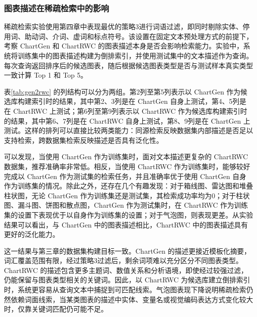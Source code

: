 \subsubsection{图表描述在稀疏检索中的影响}

稀疏检索实验使用第四章中表现最优的策略3进行词语过滤，即同时剔除实体、停用词、助动词、介词、虚词和标点符号。该设置在固定文本预处理方式的前提下，考察 ChartGen 和 ChartRWC 的图表描述本身是否会影响检索能力。实验中，系统将训练集中的图表描述构建为倒排索引，并使用测试集中的文本描述作为查询。每次查询返回排序后的候选图表，随后根据候选图表类型是否与测试样本真实类型一致计算 Top 1 和 Top 5。

表\ref{tab:gen2rwc} 的列结构可以分为两组。第2列至第5列表示以 ChartGen 作为候选库构建索引时的结果，其中第2、3列是在 ChartGen 自身上测试，第4、5列是在 ChartRWC 上测试；第6列至第9列表示以 ChartRWC 作为候选库构建索引时的结果，其中第6、7列是在 ChartRWC 自身上测试，第8、9列是在 ChartGen 上测试。这样的排列可以直接比较两类能力：同源检索反映数据集内部描述是否足以支持检索，跨数据集检索反映描述是否具有泛化性。

可以发现，当使用 ChartGen 作为训练集时，面对文本描述更复杂的 ChartRWC 数据集，推荐准确率非常低。相反，当使用 ChartRWC 作为训练集时，能够较好完成以 ChartGen 作为测试集的检索任务，并且准确率优于使用 ChartGen 自身作为训练集的情况。除此之外，还存在几个有趣发现：对于箱线图、雷达图和堆叠柱状图，无论 ChartGen 作为训练集还是测试集，其检索成功率均为0；对于柱状图、漏斗图、饼图和散点图，ChartGen 作为测试集时，在 ChartRWC 作为训练集的设置下表现优于以自身作为训练集的设置；对于气泡图，则表现更差。从实验结果可以看出，与 ChartGen 中的图表描述相比，ChartRWC 中的图表描述具有更好的泛化能力。

这一结果与第三章的数据集构建目标一致。ChartGen 的描述更接近模板化摘要，词汇覆盖范围有限，经过策略3过滤后，剩余词项难以充分区分不同图表类型。ChartRWC 的描述包含更多主题词、数值关系和分析语境，即使经过较强过滤，仍能保留与图表类型相关的关键词。因此，以 ChartRWC 为候选库建立倒排索引时，系统更容易从查询文本中捕捉到可匹配线索。气泡图表现下降说明稀疏检索仍然依赖词面线索，当某类图表的描述中实体、变量名或视觉编码表达方式变化较大时，仅靠关键词匹配仍可能不足。

